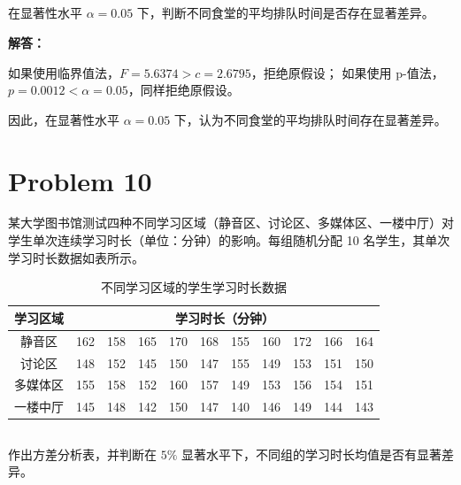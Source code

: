 \documentclass[12pt,a4paper]{article}
\begin{document}
\subsection{}

在显著性水平 $\alpha=0.05$ 下，判断不同食堂的平均排队时间是否存在显著差异。

\begin{answerbox}
\textbf{解答：}

如果使用临界值法，$F = 5.6374 > c = 2.6795$，拒绝原假设；
如果使用 p-值法，$p = 0.0012 < \alpha =0.05$，同样拒绝原假设。

因此，在显著性水平 $\alpha=0.05$ 下，认为不同食堂的平均排队时间存在显著差异。
\end{answerbox}

\section{Problem 10}

某大学图书馆测试四种不同学习区域（静音区、讨论区、多媒体区、一楼中厅）对学生单次连续学习时长（单位：分钟）的影响。每组随机分配 10 名学生，其单次学习时长数据如表所示。

\begin{table}[htbp]
\centering
\caption{不同学习区域的学生学习时长数据}
\label{tab:study}
\renewcommand{\arraystretch}{1.2}
\begin{tabular}{c*{10}{c}}
\toprule
学习区域 & \multicolumn{10}{c}{学习时长（分钟）} \\
\midrule
静音区 & 162 & 158 & 165 & 170 & 168 & 155 & 160 & 172 & 166 & 164 \\
讨论区 & 148 & 152 & 145 & 150 & 147 & 155 & 149 & 153 & 151 & 150 \\
多媒体区 & 155 & 158 & 152 & 160 & 157 & 149 & 153 & 156 & 154 & 151 \\
一楼中厅 & 145 & 148 & 142 & 150 & 147 & 140 & 146 & 149 & 144 & 143 \\
\bottomrule
\end{tabular}
\end{table}

\subsection{}

作出方差分析表，并判断在 $5\%$ 显著水平下，不同组的学习时长均值是否有显著差异。
\end{document}
